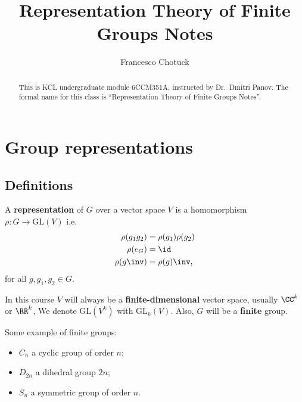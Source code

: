 \documentclass[12pt, a4paper]{article}
\title{Representation Theory of Finite Groups Notes}
\date{}
\author{Francesco Chotuck}
\newcommand{\gl}{\text{GL}}
\begin{document}
\maketitle

\begin{abstract}
    \noindent This is KCL undergraduate module 6CCM351A, instructed by Dr.\ Dmitri Panov. The formal name for this class is ``Representation Theory of Finite Groups Notes''.
\end{abstract}

\tableofcontents

\pagebreak

\section{Group representations}

\subsection{Definitions}

\begin{definition}
    A \textbf{representation} of \(G\) over a vector space \(V\) is a homomorphism \(\rho:G \to \gl(V)\) i.e. 
    \[\begin{aligned}
        \rho(g_1g_2) &=\rho(g_1)\rho(g_2) \\
        \rho(e_G) &=\id \\
        \rho(g\inv) &=\rho(g)\inv, 
    \end{aligned}\]
    for all \(g,g_1,g_2 \in G\).
\end{definition}

\begin{mdremark}
    In this course \(V\) will always be a \textbf{finite-dimensional} vector space, usually \(\CC^k\) or \(\RR^k\), We denote \(\gl(V^k)\) with \(\gl_k(V)\). Also, \(G\) will be a \textbf{finite} group.
\end{mdremark}

\begin{example}
    Some example of finite groups:
    \begin{itemize}
        \item \(C_n\) a cyclic group of order \(n\);
        \item \(D_{2n}\) a dihedral group \(2n\);
        \item \(S_n\) a symmetric group of order \(n\).
    \end{itemize}
\end{example}
\end{document}
